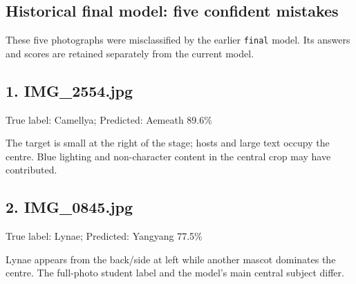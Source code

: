\documentclass[11pt]{article}
\begin{document}
\clearpage
\subsection*{Historical final model: five confident mistakes}
\par\noindent These five photographs were misclassified by the earlier \texttt{final} model. Its answers and scores are retained separately from the current model.\par
\noindent {}\par

\par\noindent\begin{minipage}{\linewidth}
\subsection*{1. IMG\_2554.jpg}
True label: Camellya; Predicted: Aemeath 89.6\%
\begin{center}\par\noindent {}\par\end{center}
The target is small at the right of the stage; hosts and large text occupy the centre. Blue lighting and non-character content in the central crop may have contributed.
\end{minipage}\par\medskip

\par\noindent\begin{minipage}{\linewidth}
\subsection*{2. IMG\_0845.jpg}
True label: Lynae; Predicted: Yangyang 77.5\%
\begin{center}\par\noindent {}\par\end{center}
Lynae appears from the back/side at left while another mascot dominates the centre. The full-photo student label and the model's main central subject differ.
\end{minipage}\par\medskip
\end{document}
